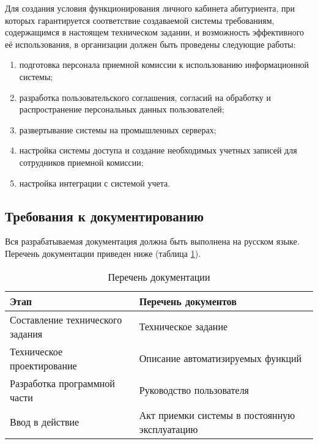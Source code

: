 Для создания условия функционирования личного кабинета абитуриента, при которых гарантируется соответствие создаваемой системы требованиям, содержащимся в настоящем техническом задании, и возможность эффективного её использования, в организации должен быть проведены следующие работы:

\begin{enumerate} 
  \item подготовка персонала приемной комиссии к использованию информационной системы;
  
  \item разработка пользовательского соглашения, согласий на обработку и распространение персональных данных пользователей;
  
  \item развертывание системы на промышленных серверах;
  
  \item настройка системы доступа и создание необходимых учетных записей для сотрудников приемной комиссии;
  
  \item настройка интеграции с системой учета.
\end{enumerate}

\subsection{Требования к документированию}

Вся разрабатываемая документация должна быть выполнена на русском языке. Перечень документации приведен ниже (таблица \ref{tab:doc}).

\begin{table}[H]
\caption{Перечень документации}
\label{tab:doc}
\begin{center}
\begin{tabular}{|p{7.2cm}|p{7.2cm}|}
\hline
Этап & Перечень документов\\
\hline
Составление технического задания&
Техническое задание\\
\hline
Техническое проектирование&
Описание автоматизируемых функций\\
\hline
Разработка программной части&
Руководство пользователя\\
\hline
Ввод в действие&
Акт приемки системы в постоянную эксплуатацию\\
\hline
\end{tabular}
\end{center}
\end{table}


